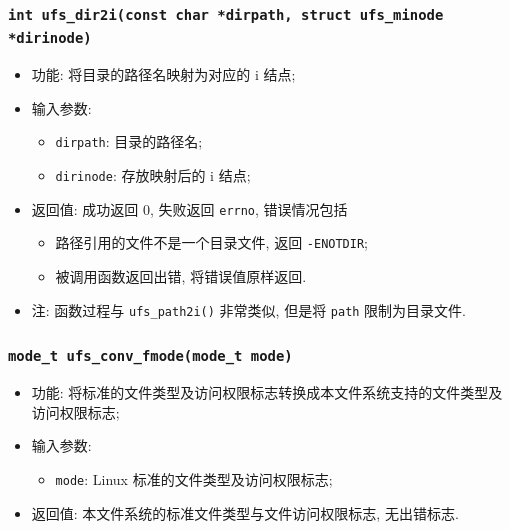 \documentclass[nofonts, titlepage]{ctexart}
\begin{document}
  \subsubsection[\texttt{ufs\_dir2i}]{\texttt{int ufs\_dir2i(const char *dirpath, struct ufs\_minode *dirinode)}}

  \begin{itemize}
\item
  功能: 将目录的路径名映射为对应的 i 结点;
\item
  输入参数:

  \begin{itemize}
  \item
    \texttt{dirpath}: 目录的路径名;
  \item
    \texttt{dirinode}: 存放映射后的 i 结点;
  \end{itemize}
\item
  返回值: 成功返回 0, 失败返回 \texttt{errno}, 错误情况包括

  \begin{itemize}
  \item
    路径引用的文件不是一个目录文件, 返回 \texttt{-ENOTDIR};
  \item
    被调用函数返回出错, 将错误值原样返回.
  \end{itemize}
\item
  注: 函数过程与 \texttt{ufs\_path2i()} 非常类似, 但是将 \texttt{path}
  限制为目录文件.
  \end{itemize}
  \subsubsection[\texttt{ufs\_conv\_fmode}]{\texttt{mode\_t ufs\_conv\_fmode(mode\_t mode)}}
  \begin{itemize}
\item
  功能:
  将标准的文件类型及访问权限标志转换成本文件系统支持的文件类型及访问权限标志;
\item
  输入参数:

  \begin{itemize}
  \item
    \texttt{mode}: Linux 标准的文件类型及访问权限标志;
  \end{itemize}
\item
  返回值: 本文件系统的标准文件类型与文件访问权限标志, 无出错标志.
  \end{itemize}
\end{document}
